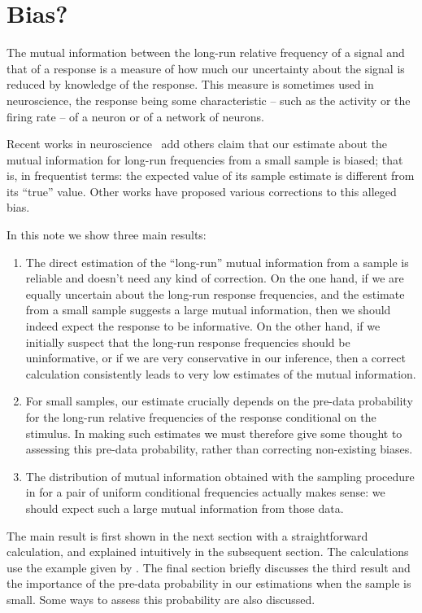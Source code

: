 \documentclass[\ifafour a4paper,12pt,\else a5paper,10pt,\fi%
onecolumn,oneside,article,%
british%
]{memoir}
\theoremstyle{remark}
\theoremstyle{innote}
\newcommand*{\citep}{\parencites}
\renewcommand*{\|}{\nonscript\,\vert\nonscript\;\mathopen{}}
\newcommand*{\puzzle}{{\fontencoding{U}\fontfamily{fontawesometwo}\selectfont\symbol{225}}}
\newcommand{\mynote}[1]{ {\color{notecolour}\puzzle\ #1}}
\begin{document}
\section{Bias?}
\label{sec:intro}

The mutual information between the long-run relative frequency of a signal
and that of a response is a measure of how much our uncertainty about the
signal is reduced by knowledge of the response. This measure is sometimes
used in neuroscience, the response being some characteristic -- such as the
activity or the firing rate -- of a neuron or of a network of neurons.

Recent works in neuroscience \citep{panzerietal2007}\mynote{add others}
claim that our estimate about the mutual information for long-run
frequencies from a small sample is biased; that is, in frequentist terms:
the expected value of its sample estimate is different from its
\enquote{true} value. Other works have proposed various corrections to this
alleged bias.

In this note we show three main results:
\begin{enumerate}[label=\arabic*.,wide]
\item The direct estimation of the \enquote{long-run} mutual information
  from a sample is reliable and doesn't need any kind of correction. On the
  one hand, if we are equally uncertain about the long-run response
  frequencies, and the estimate from a small sample suggests a large mutual
  information, then we should indeed expect the response to be informative.
  On the other hand, if we initially suspect that the long-run response
  frequencies should be uninformative, or if we are very conservative in
  our inference, then a correct calculation consistently leads to very low
  estimates of the mutual information.
\item For small samples, our estimate crucially depends on the pre-data
  probability for the long-run relative frequencies of the response
  conditional on the stimulus. In making such estimates we must therefore
  give some thought to assessing this pre-data probability, rather than
  correcting non-existing biases.
\item The distribution of mutual information obtained with the sampling
  procedure in \textcite{panzerietal2007} for a pair of uniform conditional
  frequencies actually makes sense: we should expect such a large mutual
  information from those data.
\end{enumerate}

The main result is first shown in the next section with a straightforward
calculation, and explained intuitively in the subsequent section. The
calculations use the example given by \textcite[Fig.~1]{panzerietal2007}.
The final section briefly discusses the third result and the importance of
the pre-data probability in our estimations when the sample is small. Some
ways to assess this probability are also discussed.
\end{document}
